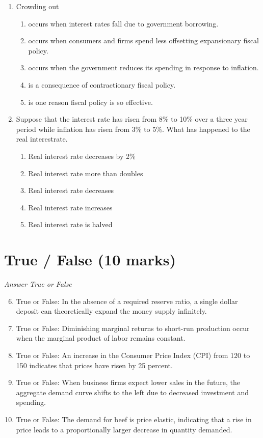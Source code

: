 \documentclass[12pt]{article}
\begin{document}
\begin{enumerate}[label=\arabic*.]
\begin{enumerate}[label=(\alph*)]
    \item Central banks have less control over interest rates
\end{enumerate}
\item Crowding out
\begin{enumerate}[label=(\alph*)]
    \item occurs when interest rates fall due to government borrowing.
    \item occurs when consumers and firms spend less offsetting expansionary fiscal policy.
    \item occurs when the government reduces its spending in response to inflation.
    \item is a consequence of contractionary fiscal policy.
    \item is one reason fiscal policy is so effective.
\end{enumerate}
\item Suppose that the interest rate has risen from 8\% to 10\% over a three year period while inflation has risen from 3\% to 5\%. What has happened to the real interestrate.
\begin{enumerate}[label=(\alph*)]
    \item Real interest rate decreases by 2\%
    \item Real interest rate more than doubles
    \item Real interest rate decreases
    \item Real interest rate increases
    \item Real interest rate is halved
\end{enumerate}
\end{enumerate}

\section*{True / False (10 marks)}
\textit{Answer True or False}
\begin{enumerate}[label=\arabic*.]
\setcounter{enumi}{5}
\item True or False: In the absence of a required reserve ratio, a single dollar deposit can theoretically expand the money supply infinitely.
\item True or False: Diminishing marginal returns to short-run production occur when the marginal product of labor remains constant.
\item True or False: An increase in the Consumer Price Index (CPI) from 120 to 150 indicates that prices have risen by 25 percent.
\item True or False: When business firms expect lower sales in the future, the aggregate demand curve shifts to the left due to decreased investment and spending.
\item True or False: The demand for beef is price elastic, indicating that a rise in price leads to a proportionally larger decrease in quantity demanded.
\end{enumerate}
\end{document}
